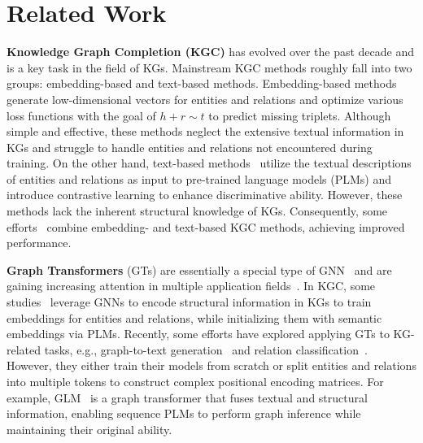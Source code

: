 \section{Related Work}
\label{Related_work:}

\textbf{Knowledge Graph Completion (KGC)} has evolved over the past decade and is a key task in the field of KGs. 
Mainstream KGC methods roughly fall into two groups: embedding-based and text-based methods.
Embedding-based methods~\cite{bordes2013translating, lin2015learning, sun2019rotate, balavzevic2019tucker} generate low-dimensional vectors for entities and relations and optimize various loss functions with the goal of $h+r \sim t$ to predict missing triplets. 
Although simple and effective, these methods neglect the extensive textual information in KGs and struggle to handle entities and relations not encountered during training.
On the other hand, text-based methods~\cite{yao2019kg, zhang2020pretrain, wang2022simkgc, liu2022know, wang2022language, yang2024knowledge} utilize the textual descriptions of entities and relations as input to pre-trained language models (PLMs) and introduce contrastive learning to enhance discriminative ability. 
However, these methods lack the inherent structural knowledge of KGs.
Consequently, some efforts~\cite{wang2021structure, chen2023dipping, he2024mocosa, yang2024knowledge, qiu2024joint} combine embedding- and text-based KGC methods, achieving improved performance.

\textbf{Graph Transformers} (GTs) are essentially a special type of GNN~\cite{bronstein2021geometric} and are gaining increasing attention in multiple application fields~\cite{chen2024survey}. In KGC, some studies~\cite{schlichtkrull2018modeling, vashishth2019composition, nathani2019learning, chen2020hitter, wang2022simple, tan2023kracl, galkin2023towards} leverage GNNs to encode structural information in KGs to train embeddings for entities and relations, while initializing them with semantic embeddings via PLMs. Recently, some efforts have explored applying GTs to KG-related tasks, e.g., graph-to-text generation~\cite{schmitt2020modeling, li2024unifying} and relation classification~\cite{plenz-frank-2024-graph}. However, they either train their models from scratch or split entities and relations into multiple tokens to construct complex positional encoding matrices.
For example, GLM~\cite{plenz-frank-2024-graph} is a graph transformer that fuses textual and structural information, enabling sequence PLMs to perform graph inference while maintaining their original ability.

